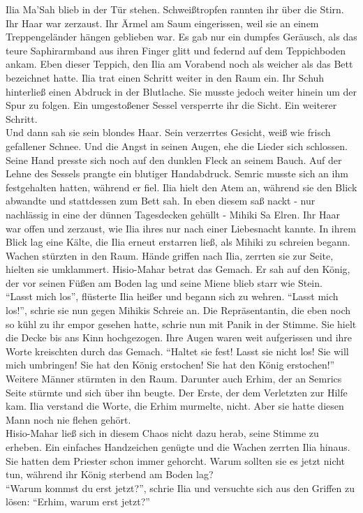 Ilia Ma'Sah blieb in der Tür stehen. Schweißtropfen rannten ihr über die Stirn. Ihr Haar war 
zerzaust. Ihr Ärmel am Saum eingerissen, weil sie an einem Treppengeländer hängen geblieben war. Es 
gab nur ein dumpfes Geräusch, als das teure Saphirarmband aus ihren Finger glitt und federnd auf 
dem Teppichboden ankam. Eben dieser Teppich, den Ilia am Vorabend noch als weicher als das Bett 
bezeichnet hatte. Ilia trat einen Schritt weiter in den Raum ein. Ihr Schuh hinterließ einen 
Abdruck in der Blutlache. Sie musste jedoch weiter hinein um der Spur zu folgen. Ein umgestoßener 
Sessel versperrte ihr die Sicht. Ein weiterer Schritt.\\
Und dann sah sie sein blondes Haar. Sein verzerrtes Gesicht, weiß wie frisch gefallener Schnee. Und 
die Angst in seinen Augen, ehe die Lieder sich schlossen. Seine Hand presste sich noch auf den 
dunklen Fleck an seinem Bauch. Auf der Lehne des Sessels prangte ein blutiger Handabdruck. Semric 
musste sich an ihm festgehalten hatten, während er fiel. Ilia hielt den Atem an, während sie den 
Blick abwandte und stattdessen zum Bett sah. In eben diesem saß nackt - nur nachlässig in eine der 
dünnen Tagesdecken gehüllt - Mihiki Sa Elren. Ihr Haar war offen und zerzaust, wie Ilia ihres nur 
nach einer Liebesnacht kannte. In ihrem Blick lag eine Kälte, die Ilia erneut erstarren ließ, als 
Mihiki zu schreien begann.\\
Wachen stürzten in den Raum. Hände griffen nach Ilia, zerrten sie zur Seite, hielten sie 
umklammert. Hisio-Mahar betrat das Gemach. Er sah auf den König, der vor seinen Füßen am Boden lag 
und seine Miene blieb starr wie Stein.\\
``Lasst mich los'', flüsterte Ilia heißer und begann sich zu wehren. ``Lasst mich los!'', schrie 
sie nun gegen Mihikis Schreie an. Die Repräsentantin, die eben noch so kühl zu ihr empor gesehen 
hatte, schrie nun mit Panik in der Stimme. Sie hielt die Decke bis ans Kinn hochgezogen. Ihre Augen 
waren weit aufgerissen und ihre Worte kreischten durch das Gemach. ``Haltet sie fest! Lasst sie 
nicht los! Sie will mich umbringen! Sie hat den König erstochen! Sie hat den König erstochen!''\\
Weitere Männer stürmten in den Raum. Darunter auch Erhim, der an Semrics Seite stürmte und sich 
über ihn beugte. Der Erste, der dem Verletzten zur Hilfe kam. Ilia verstand die Worte, die Erhim 
murmelte, nicht. Aber sie hatte diesen Mann noch nie flehen gehört.\\
Hisio-Mahar ließ sich in diesem Chaos nicht dazu herab, seine Stimme zu erheben. Ein einfaches 
Handzeichen genügte und die Wachen zerrten Ilia hinaus. Sie hatten dem Priester schon immer 
gehorcht. Warum sollten sie es jetzt nicht tun, während ihr König sterbend am Boden lag?\\
``Warum kommst du erst jetzt?'', schrie Ilia und versuchte sich aus den Griffen zu lösen: 
``Erhim, warum erst jetzt?''\\

